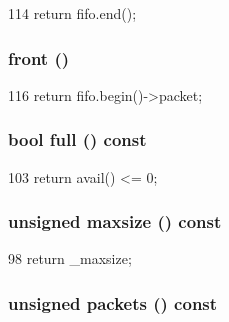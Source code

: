 \begin{DoxyCode}
114 { return fifo.end(); }
\end{DoxyCode}
\hypertarget{classPacketFifo_a12006410db3b841b4764c57a9546d246}{
\subsubsection[{front}]{ front ()}}
\label{classPacketFifo_a12006410db3b841b4764c57a9546d246}



\begin{DoxyCode}
116 { return fifo.begin()->packet; }
\end{DoxyCode}
\hypertarget{classPacketFifo_aa0b75676033302511679a2f5e9638c4d}{
\subsubsection[{full}]{\setlength{\rightskip}{0pt plus 5cm}bool full () const}}
\label{classPacketFifo_aa0b75676033302511679a2f5e9638c4d}



\begin{DoxyCode}
103 { return avail() <= 0; }
\end{DoxyCode}
\hypertarget{classPacketFifo_ac62d045925522fd0bcc4261a036b79bc}{
\subsubsection[{maxsize}]{\setlength{\rightskip}{0pt plus 5cm}unsigned maxsize () const}}
\label{classPacketFifo_ac62d045925522fd0bcc4261a036b79bc}



\begin{DoxyCode}
98 { return _maxsize; }
\end{DoxyCode}
\hypertarget{classPacketFifo_a4c2cf4d8a6e10ea9a6a75a9a47044905}{
\subsubsection[{packets}]{\setlength{\rightskip}{0pt plus 5cm}unsigned packets () const}}
\label{classPacketFifo_a4c2cf4d8a6e10ea9a6a75a9a47044905}



